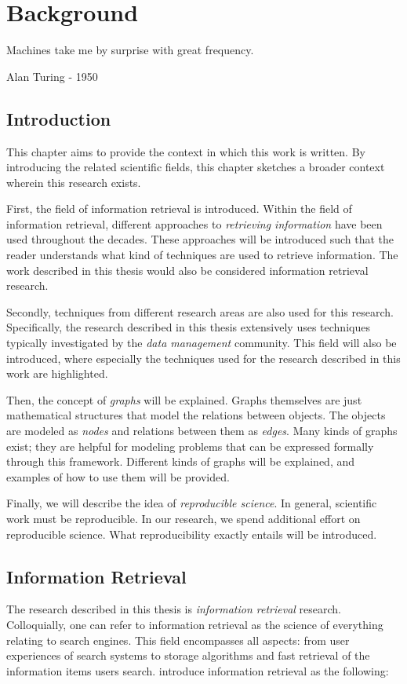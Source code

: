 \chapter{Background}
\label{related-work}

\epigraph{Machines take me by surprise with great frequency.}{Alan Turing - 1950}

\section{Introduction}
This chapter aims to provide the context in which this work is written. By introducing the related scientific fields, this chapter sketches a broader context wherein this research exists. 

First, the field of information retrieval is introduced. Within the field of information retrieval, different approaches to \emph{retrieving information} have been used throughout the decades. These approaches will be introduced such that the reader understands what kind of techniques are used to retrieve information. The work described in this thesis would also be considered information retrieval research. 

Secondly, techniques from different research areas are also used for this research. Specifically, the research described in this thesis extensively uses techniques typically investigated by the \emph{data management} community. This field will also be introduced, where especially the techniques used for the research described in this work are highlighted. 

Then, the concept of \emph{graphs} will be explained. Graphs themselves are just mathematical structures that model the relations between objects. The objects are modeled as \emph{nodes} and relations between them as \emph{edges}. Many kinds of graphs exist; they are helpful for modeling problems that can be expressed formally through this framework. Different kinds of graphs will be explained, and examples of how to use them will be provided.

Finally, we will describe the idea of \emph{reproducible science}. In general, scientific work must be reproducible. In our research, we spend additional effort on reproducible science. What reproducibility exactly entails will be introduced.  

\section{Information Retrieval}
The research described in this thesis is \emph{information retrieval} research. Colloquially, one can refer to information retrieval as the science of everything relating to search engines. This field encompasses all aspects: from user experiences of search systems to storage algorithms and fast retrieval of the information items users search.  introduce information retrieval as the following:

